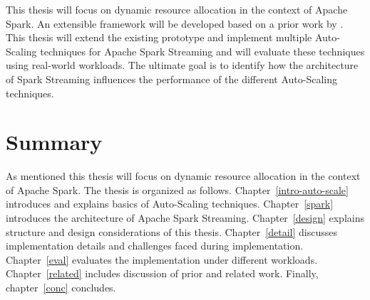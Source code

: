 This thesis will focus on dynamic resource allocation in the context of Apache Spark. An extensible framework will be developed based on a prior work by \textcite{Michal:2017}. This thesis will extend the existing prototype and implement multiple Auto-Scaling techniques for Apache Spark Streaming and will evaluate these techniques using real-world workloads. The ultimate goal is to identify how the architecture of Spark Streaming influences the performance of the different Auto-Scaling techniques.

\section{Summary}
As mentioned this thesis will focus on dynamic resource allocation in the context of Apache Spark. The thesis is organized as follows. Chapter~\ref{intro-auto-scale} introduces and explains basics of Auto-Scaling techniques. Chapter~\ref{spark} introduces the architecture of Apache Spark Streaming. Chapter~\ref{design} explains structure and design considerations of this thesis. Chapter~\ref{detail} discusses implementation details and challenges faced during implementation. Chapter~\ref{eval} evaluates the implementation under different workloads. Chapter~\ref{related} includes discussion of prior and related work. Finally, chapter~\ref{conc} concludes.